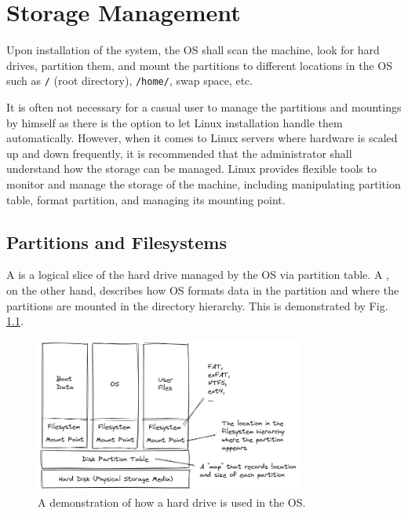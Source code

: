 \chapter{Storage Management}

Upon installation of the system, the OS shall scan the machine, look for hard drives, partition them, and mount the partitions to different locations in the OS such as \verb|/| (root directory), \verb|/home/|, swap space, etc.

It is often not necessary for a casual user to manage the partitions and mountings by himself as there is the option to let Linux installation handle them automatically. However, when it comes to Linux servers where hardware is scaled up and down frequently, it is recommended that the administrator shall understand how the storage can be managed. Linux provides flexible tools to monitor and manage the storage of the machine, including manipulating partition table, format partition, and managing its mounting point.

\section{Partitions and Filesystems}

A  is a logical slice of the hard drive managed by the OS via partition table. A , on the other hand, describes how OS formats data in the partition and where the partitions are mounted in the directory hierarchy. This is demonstrated by Fig. \ref{ch:dm:fig:partition}.

\begin{figure}[htbp]
	\centering
	\includegraphics[width=250pt]{chapters/part-2/figures/partition.png}
	\caption{A demonstration of how a hard drive is used in the OS.} \label{ch:dm:fig:partition}
\end{figure}

